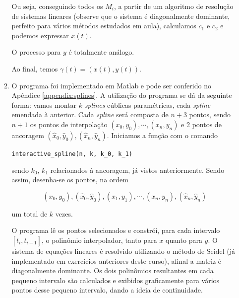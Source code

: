 \documentclass{article}
\begin{document}
\begin{enumerate}
\begin{enumerate}
                    Ou seja, conseguindo todos os $M_i$, a partir de um algoritmo
                    de resolução de sistemas lineares (observe que o sistema
                    é diagonalmente dominante, perfeito para vários métodos estudados
                    em aula), calculamos $c_1$ e $c_2$ e podemos
                    expressar $x(t)$.

                    O processo para $y$ é totalmente análogo.

                    Ao final, temos $\gamma(t) = (x(t), y(t))$.

                \item O programa foi implementado em Matlab e pode ser conferido no Apêndice
                    \ref{appendix:splines}.
                    A utilização do programa se dá da seguinte forma:
                    vamos montar $k$ \textit{splines} cúblicas paramétricas, cada \textit{spline}
                    emendada à anterior. Cada \textit{spline} será composta de $n + 3$ pontos,
                    sendo $n + 1$ os pontos de interpolação $(x_0, y_0), \cdots, (x_n, y_n)$
                    e 2 pontos de ancoragem $(\hat{x}_0, \hat{y}_0), (\hat{x}_n, \hat{y}_n)$.
                    Iniciamos a função com o comando
                    
                    \begin{center}
                        \lstinline{interactive_spline(n, k, k_0, k_1)}
                    \end{center}

                    sendo $k_0$, $k_1$ relacionados à ancoragem, já vistos anteriormente.
                    Sendo assim, desenha-se os pontos, na ordem

                    $$(x_0, y_0), (\hat{x}_0, \hat{y}_0), (x_1, y_1), \cdots, (x_n, y_n), (\hat{x}_n, \hat{y}_n)$$

                    um total de $k$ vezes.

                    O programa lê os pontos selecionados e constrói, para cada intervalo $[t_i, t_{i+1}]$,
                    o polinômio interpolador, tanto para $x$ quanto para $y$.
                    O sistema de equações lineares é resolvido utilizando
                    o método de Seidel (já implementado em exercícios anteriores deste curso),
                    afinal a matriz é diagonalmente dominante.
                    Os dois polinômios resultantes em cada pequeno intervalo são calculados
                    e exibidos graficamente para vários
                    pontos desse pequeno intervalo, dando a ideia de continuidade.


\end{enumerate}
\end{enumerate}
\end{document}
